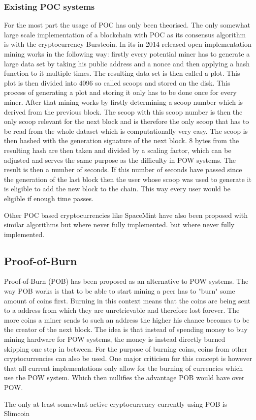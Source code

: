 \subsubsection{Existing POC systems}

For the most part the usage of POC has only been theorised. The only somewhat large scale implementation of a blockchain with POC as its consensus algorithm is with the cryptocurrency Burstcoin.
In its in 2014 released open implementation mining works in the following way: firstly every potential miner has to generate a large data set by taking his public address and a nonce and then
applying a hash function to it multiple times. The resulting data set is then called a plot. This plot is then divided into 4096 so called scoops and stored on the disk. This process of generating
a plot and storing it only has to be done once for every miner. After that mining works by firstly determining a scoop number which is derived from the previous block. The scoop with this scoop
number is then the only scoop relevant for the next block and is therefore the only scoop that has to be read from the whole dataset which is computationally very easy. The scoop is then hashed
with the generation signature of the next block. 8 bytes from the resulting hash are then taken and divided by a scaling factor, which can be adjusted and serves the same purpose as the difficulty
in POW systems. The result is then a number of seconds. If this number of seconds have passed since the generation of the last block then the user whose scoop was used to generate it is eligible
to add the new block to the chain. This way every user would be eligible if enough time passes.\cite{url:burstcoin}\par
Other POC based cryptocurrencies like SpaceMint have also been proposed with similar algorithms but where never fully implemented. but where never fully implemented.\cite{url:spacemint}

\subsection{Proof-of-Burn}

Proof-of-Burn (POB) has been proposed as an alternative to POW systems. The way POB works is that to be able to start mining a peer has to "burn" some amount of coins first. Burning in this context
means that the coins are being sent to a address from which they are unretrievable and therefore lost forever. The more coins a miner sends to such an address the higher his chance becomes
to be the creator of the next block. The idea is that instead of spending money to buy mining hardware for POW systems, the money is instead directly burned skipping one step in between.
For the purpose of burning coins, coins from other cryptocurrencies can also be used. One major criticism for this concept is however that all current implementations only allow for the
burning of currencies which use the POW system. Which then nullifies the advantage POB would have over POW.\par
The only at least somewhat active cryptocurrency currently using POB is Slimcoin\cite{url:pob}

